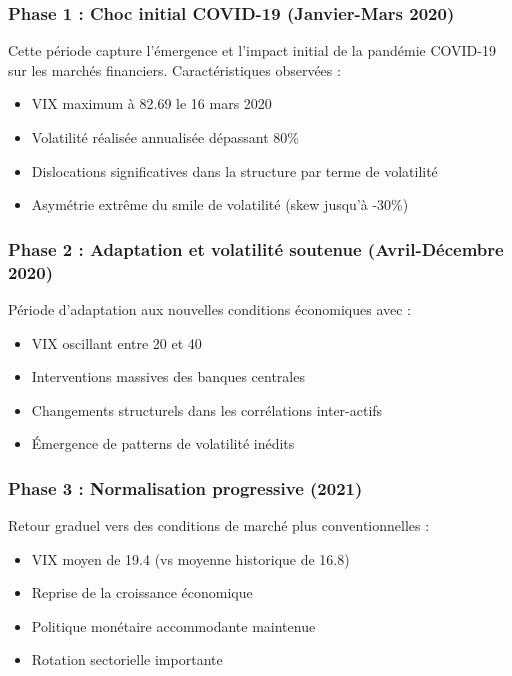 \subsubsection{Phase 1 : Choc initial COVID-19 (Janvier-Mars 2020)}

Cette période capture l'émergence et l'impact initial de la pandémie COVID-19 sur les marchés financiers. Caractéristiques observées :
\begin{itemize}
\item VIX maximum à 82.69 le 16 mars 2020
\item Volatilité réalisée annualisée dépassant 80\%
\item Dislocations significatives dans la structure par terme de volatilité
\item Asymétrie extrême du smile de volatilité (skew jusqu'à -30\%)
\end{itemize}

\subsubsection{Phase 2 : Adaptation et volatilité soutenue (Avril-Décembre 2020)}

Période d'adaptation aux nouvelles conditions économiques avec :
\begin{itemize}
\item VIX oscillant entre 20 et 40
\item Interventions massives des banques centrales
\item Changements structurels dans les corrélations inter-actifs
\item Émergence de patterns de volatilité inédits
\end{itemize}

\subsubsection{Phase 3 : Normalisation progressive (2021)}

Retour graduel vers des conditions de marché plus conventionnelles :
\begin{itemize}
\item VIX moyen de 19.4 (vs moyenne historique de 16.8)
\item Reprise de la croissance économique
\item Politique monétaire accommodante maintenue
\item Rotation sectorielle importante
\end{itemize}

